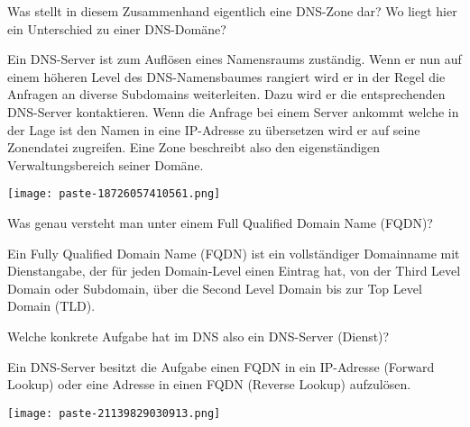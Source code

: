 \documentclass{article}
\begin{document}
\begin{tcolorbox}[colback=white!10!white,colframe=lightgray!75!black,
  savelowerto=\jobname_ex.tex,breakable,enhanced,lines before break=40]

\justifying
Was stellt in diesem Zusammenhand eigentlich eine DNS-Zone dar? Wo liegt hier ein Unterschied zu einer DNS-Domäne?

\tcblower

\justifying
Ein DNS-Server ist zum Auflösen eines Namensraums zuständig. Wenn er nun auf einem höheren Level des DNS-Namensbaumes rangiert wird er in der Regel die Anfragen an diverse Subdomains weiterleiten. Dazu wird er die entsprechenden DNS-Server kontaktieren. Wenn die Anfrage bei einem Server ankommt welche in der Lage ist den Namen in eine IP-Adresse zu übersetzen wird er auf seine Zonendatei zugreifen. Eine Zone beschreibt also den eigenständigen Verwaltungsbereich seiner Domäne.\begin{center}
\texttt{[image: paste-18726057410561.png]}
\end{center}

\end{tcolorbox}
\begin{tcolorbox}[colback=white!10!white,colframe=lightgray!75!black,
  savelowerto=\jobname_ex.tex,breakable,enhanced,lines before break=40]

\justifying
Was genau versteht man unter einem Full Qualified Domain Name (FQDN)?

\tcblower

\justifying
Ein Fully Qualified Domain Name (FQDN) ist ein vollständiger Domainname mit Dienstangabe, der für jeden Domain-Level einen Eintrag hat, von der Third Level Domain oder Subdomain, über die Second Level Domain bis zur Top Level Domain (TLD).
\end{tcolorbox}
\begin{tcolorbox}[colback=white!10!white,colframe=lightgray!75!black,
  savelowerto=\jobname_ex.tex,breakable,enhanced,lines before break=40]

\justifying
Welche konkrete Aufgabe hat im DNS also ein DNS-Server (Dienst)?

\tcblower

\justifying
Ein DNS-Server besitzt die Aufgabe einen FQDN in ein IP-Adresse (Forward Lookup) oder eine Adresse in einen FQDN (Reverse Lookup) aufzulösen.\begin{center}
\texttt{[image: paste-21139829030913.png]}
\end{center}

\end{tcolorbox}
\end{document}
